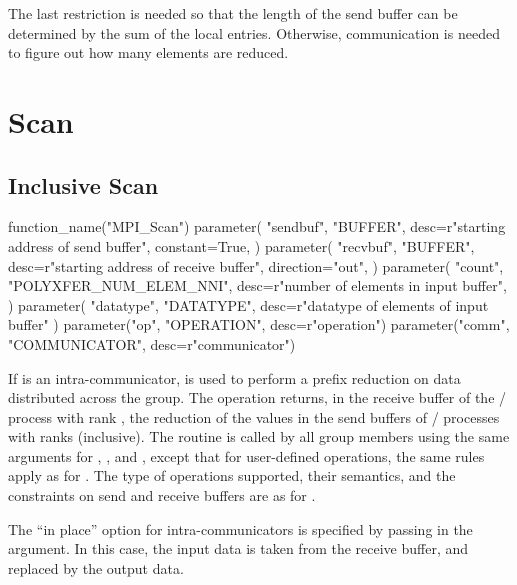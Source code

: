 \begin{rationale}
The last restriction is needed so that the length of the send
buffer can be determined by the sum of the local  entries.
Otherwise, communication is needed to figure out how many elements
are reduced.
\end{rationale}

\section{Scan}
\label{sec:coll-scan}
\subsection{Inclusive Scan}
\label{subsec:coll-scan}
%
\begin{mpi-binding}
    function_name("MPI_Scan")
    parameter(
        "sendbuf",
        "BUFFER",
        desc=r"starting address of send buffer",
        constant=True,
    )
    parameter(
        "recvbuf",
        "BUFFER",
        desc=r"starting address of receive buffer",
        direction="out",
    )
    parameter(
        "count",
        "POLYXFER_NUM_ELEM_NNI",
        desc=r"number of elements in input buffer",
    )
    parameter(
        "datatype", "DATATYPE", desc=r"datatype of elements of input buffer"
    )
    parameter("op", "OPERATION", desc=r"operation")
    parameter("comm", "COMMUNICATOR", desc=r"communicator")
\end{mpi-binding}

If  is an intra-communicator,
 is used to perform a prefix reduction
on data distributed across the group.
The operation returns, in the receive buffer of the \MPI/ process with rank
, the
reduction of the values in the send buffers of \MPI/ processes with ranks
 (inclusive).  The routine is called by all
group members using the same arguments for , ,
 and ,
except that for user-defined operations, the same rules apply as for
. The type of operations supported, their semantics,
and the constraints on send and receive buffers are as for
.

The ``in place'' option  for intra-communicators is specified by passing
in the  argument.  In this case, the input data is
taken from the receive buffer, and replaced by the output data.

